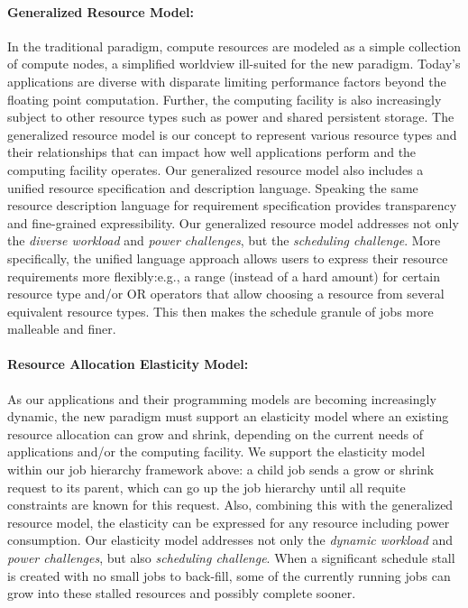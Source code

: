\documentclass{article}
\begin{document}
\paragraph{Generalized Resource Model:}
In the traditional paradigm, compute resources are modeled as a simple collection of compute nodes,
a simplified worldview ill-suited for the new paradigm. 
Today's applications are diverse with disparate limiting performance 
factors beyond the floating point computation. Further, the computing facility
is also increasingly subject to other resource types such as power
and shared persistent storage. The generalized resource model is our concept
to represent various resource types and their relationships 
that can impact how well applications perform and the computing
facility operates. Our generalized resource model also includes a
unified resource specification and description language. Speaking the
same resource description language for requirement specification 
provides transparency and fine-grained expressibility.
Our generalized resource model addresses not only the {\sl diverse workload}
and {\sl power challenges}, but the {\sl scheduling challenge}. More specifically, 
the unified language approach allows users to express their resource requirements
more flexibly:e.g., a range (instead of a hard amount) for certain resource type and/or OR operators
that allow choosing a resource from several equivalent resource types. This then makes the
schedule granule of jobs more malleable and finer. 


\paragraph{Resource Allocation Elasticity Model:}
As our applications and their programming models are becoming increasingly
dynamic, the new paradigm must support an elasticity model where an existing
resource allocation can grow and shrink, depending on the current needs
of applications and/or the computing facility. We support the 
elasticity model within our job hierarchy framework above: a child job sends
a grow or shrink request to its parent, which can go up the job hierarchy
until all requite constraints are known for this request. Also, combining
this with the generalized resource model, the elasticity can be expressed for
any resource including power consumption. Our elasticity model addresses
not only the {\sl dynamic workload} and {\sl power challenges}, but also
{\sl scheduling challenge}. When a significant schedule stall is created 
with no small jobs to back-fill, some of the currently running
jobs can grow into these stalled resources and possibly complete sooner.  
\end{document}
